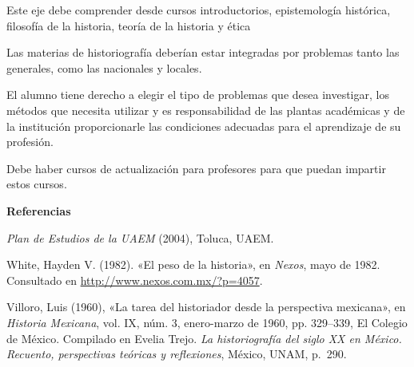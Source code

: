 Este eje debe comprender desde cursos introductorios, epistemología
histórica, filosofía de la historia, teoría de la historia y ética 

Las materias de historiografía deberían estar integradas por problemas tanto
las generales, como las nacionales y locales. 

El alumno tiene derecho a elegir el tipo de problemas que desea investigar,
los métodos que necesita utilizar y es responsabilidad de las plantas
académicas y de la institución proporcionarle las condiciones adecuadas
para el aprendizaje de su profesión.

Debe haber cursos de actualización para profesores para que puedan impartir
estos cursos. 
\newpage

\textbf{Referencias}

\bigskip
\textit{Plan de Estudios de la UAEM} (2004), Toluca, UAEM.

White, Hayden V. (1982).  «El peso de la 
historia», en \textit{Nexos}, mayo de 1982. Consultado en 
\url{http://www.nexos.com.mx/?p=4057}.

Villoro, Luis (1960),  «La tarea del historiador desde la perspectiva 
mexicana», en \textit{Historia Mexicana}, vol. IX, núm. 3, enero-marzo 
de 1960, pp. 329--339, El Colegio de México. Compilado en Evelia Trejo. 
\textit{La historiografía del siglo XX en México. Recuento, 
perspectivas teóricas y reflexiones}, México, UNAM, p.\  290.
